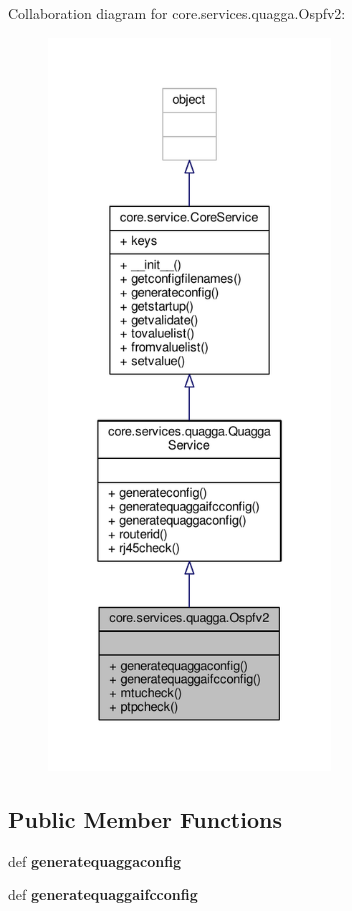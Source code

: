 Collaboration diagram for core.\+services.\+quagga.\+Ospfv2\+:
\nopagebreak
\begin{figure}[H]
\begin{center}
\leavevmode
\includegraphics[height=550pt]{classcore_1_1services_1_1quagga_1_1_ospfv2__coll__graph}
\end{center}
\end{figure}
\subsection*{Public Member Functions}
\begin{DoxyCompactItemize}
\item 
\hypertarget{classcore_1_1services_1_1quagga_1_1_ospfv2_a230d1f7ae9ec0684ca6e7b5f53a6ce6e}{def {\bfseries generatequaggaconfig}}\label{classcore_1_1services_1_1quagga_1_1_ospfv2_a230d1f7ae9ec0684ca6e7b5f53a6ce6e}

\item 
\hypertarget{classcore_1_1services_1_1quagga_1_1_ospfv2_a09fdd2acd4058b977189230eb3d38a9a}{def {\bfseries generatequaggaifcconfig}}\label{classcore_1_1services_1_1quagga_1_1_ospfv2_a09fdd2acd4058b977189230eb3d38a9a}

\end{DoxyCompactItemize}
